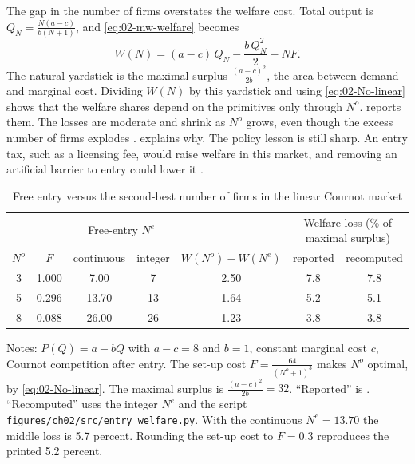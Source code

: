 The gap in the number of firms overstates the welfare cost. Total output is
$Q_N = \frac{N(a - c)}{b(N + 1)}$, and \eqref{eq:02-mw-welfare} becomes
\begin{equation*}
W(N) = (a - c)\, Q_N - \frac{b\, Q_N^2}{2} - N F .
\end{equation*}
The natural yardstick is the maximal surplus $\frac{(a - c)^2}{2b}$, the area between demand and marginal cost.
Dividing $W(N)$ by this yardstick and using \eqref{eq:02-No-linear} shows that the welfare shares depend on the
primitives only through $N^o$.  reports them. The losses are moderate and shrink as $N^o$ grows, even
though the excess number of firms explodes \citep[n.~8]{MankiwWhinston1986}.  explains why.
The policy lesson is still sharp. An entry tax, such as a licensing fee, would raise welfare in this market, and
removing an artificial barrier to entry could lower it \citep[p.~53]{MankiwWhinston1986}.

\begin{table}[htbp]
\centering
\begin{threeparttable}
\caption{Free entry versus the second-best number of firms in the linear Cournot market}
\label{tab:02-mw}
\begin{tabular}{@{}ccccccc@{}}
\toprule
 & & \multicolumn{2}{c}{Free-entry $N^e$} & & \multicolumn{2}{c}{Welfare loss (\% of maximal surplus)} \\
\cmidrule(lr){3-4}\cmidrule(l){6-7}
$N^o$ & $F$ & continuous & integer & $W(N^o) - W(N^e)$ & reported & recomputed \\
\midrule
3 & 1.000 & 7.00 & 7 & 2.50 & 7.8 & 7.8 \\
5 & 0.296 & 13.70 & 13 & 1.64 & 5.2 & 5.1 \\
8 & 0.088 & 26.00 & 26 & 1.23 & 3.8 & 3.8 \\
\bottomrule
\end{tabular}
\begin{tablenotes}\footnotesize
\item Notes: $P(Q) = a - bQ$ with $a - c = 8$ and $b = 1$, constant marginal cost $c$, Cournot competition after
entry. The set-up cost $F = \frac{64}{(N^o + 1)^3}$ makes $N^o$ optimal, by \eqref{eq:02-No-linear}. The maximal
surplus is $\frac{(a - c)^2}{2b} = 32$. ``Reported'' is \citet[n.~8, p.~53]{MankiwWhinston1986}. ``Recomputed'' uses
the integer $N^e$ and the script \texttt{figures/ch02/src/entry\_welfare.py}. With the continuous $N^e = 13.70$ the
middle loss is 5.7 percent. Rounding the set-up cost to $F = 0.3$ reproduces the printed 5.2 percent.
\end{tablenotes}
\end{threeparttable}
\end{table}

